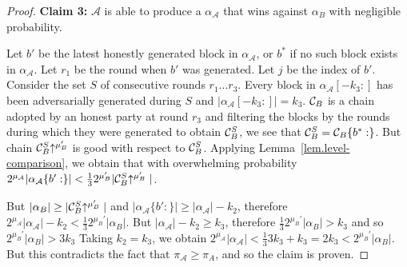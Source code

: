 \begin{proof}
    \textbf{Claim 3: } $\mathcal{A}$ is able to produce a $\alpha_\mathcal{A}$
    that wins against $\alpha_B$ with negligible probability.

    Let $b'$ be the latest honestly generated block in $\alpha_\mathcal{A}$, or
    $b^*$ if no such block exists in $\alpha_\mathcal{A}$. Let $r_1$ be the
    round when $b'$ was generated. Let $j$ be the index of $b'$.
    Consider the set $S$ of consecutive rounds $r_1 \ldots r_3$. Every block
    in $\alpha_\mathcal{A}[-k_3:]$ has been adversarially generated during $S$
    and $|\alpha_\mathcal{A}[-k_3:]| = k_3$. $\mathcal{C}_B$ is a chain adopted by an
    honest party at round $r_3$ and filtering the blocks by the rounds during
    which they were generated to obtain $\mathcal{C}_B^S$, we see that $\mathcal{C}_B^S =
    \mathcal{C}_B\{b^*:\}$.
    But chain $\mathcal{C}_B^S\negthickspace\uparrow^{\mu_B'}$ is good with
    respect to $\mathcal{C}_B^S$. Applying Lemma~\ref{lem.level-comparison}, we
    obtain that with overwhelming probability
    $2^{\mu_\mathcal{A}}|\alpha_\mathcal{A}\{b':\}| <
    \frac{1}{3}2^{\mu_B'}|\mathcal{C}_B^S\negthickspace\uparrow^{\mu_B'}|$.

    But $|\alpha_B| \geq |\mathcal{C}_B^S\negthickspace\uparrow^{\mu_B'}|$ and
    $|\alpha_\mathcal{A}\{b':\}| \geq |\alpha_\mathcal{A}| - k_2$, therefore
    $2^{\mu_\mathcal{A}}|\alpha_\mathcal{A}| - k_2 <
    \frac{1}{3}2^{\mu_B'}|\alpha_B|$.
    But $|\alpha_\mathcal{A}| - k_2 \geq k_3$, therefore
    $\frac{1}{3}2^{\mu_B'}|\alpha_B| > k_3$ and so $2^{\mu_B'}|\alpha_B| > 3k_3$
    Taking $k_2 = k_3$, we obtain
    $2^{\mu_\mathcal{A}}|\alpha_\mathcal{A}| <
    \frac{1}{3}3k_3 + k_3 = 2k_3 < 2^{\mu_B'}|\alpha_B|$.
    But this contradicts the fact that
    $\pi_\mathcal{A} \geq \pi_A$, and so the claim is proven.


\end{proof}
